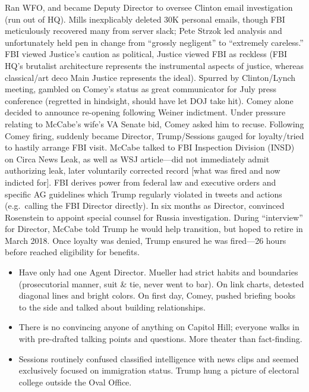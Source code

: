 \documentclass[
]{article}
\begin{document}
Ran WFO, and became Deputy Director to oversee Clinton email
investigation (run out of HQ). Mills inexplicably deleted 30K personal
emails, though FBI meticulously recovered many from server slack; Pete
Strzok led analysis and unfortunately held pen in change from ``grossly
negligent'' to ``extremely careless.'' FBI viewed Justice's caution as
political, Justice viewed FBI as reckless (FBI HQ's brutalist
architecture represents the instrumental aspects of justice, whereas
classical/art deco Main Justice represents the ideal). Spurred by
Clinton/Lynch meeting, gambled on Comey's status as great communicator
for July press conference (regretted in hindsight, should have let DOJ
take hit). Comey alone decided to announce re-opening following Weiner
indictment. Under pressure relating to McCabe's wife's VA Senate bid,
Comey asked him to recuse. Following Comey firing, suddenly became
Director, Trump/Sessions gauged for loyalty/tried to hastily arrange FBI
visit. McCabe talked to FBI Inspection Division (INSD) on Circa News
Leak, as well as WSJ article---did not immediately admit authorizing
leak, later voluntarily corrected record {[}what was fired and now
indicted for{]}. FBI derives power from federal law and executive orders
and specific AG guidelines which Trump regularly violated in tweets and
actions (e.g.~calling the FBI Director directly). In six months as
Director, convinced Rosenstein to appoint special counsel for Russia
investigation. During ``interview'' for Director, McCabe told Trump he
would help transition, but hoped to retire in March 2018. Once loyalty
was denied, Trump ensured he was fired---26 hours before reached
eligibility for benefits.

\begin{itemize}
\item
  Have only had one Agent Director. Mueller had strict habits and
  boundaries (prosecutorial manner, suit \& tie, never went to bar). On
  link charts, detested diagonal lines and bright colors. On first day,
  Comey, pushed briefing books to the side and talked about building
  relationships.
\item
  There is no convincing anyone of anything on Capitol Hill; everyone
  walks in with pre-drafted talking points and questions. More theater
  than fact-finding.
\item
  Sessions routinely confused classified intelligence with news clips
  and seemed exclusively focused on immigration status. Trump hung a
  picture of electoral college outside the Oval Office.
\end{itemize}
\end{document}
